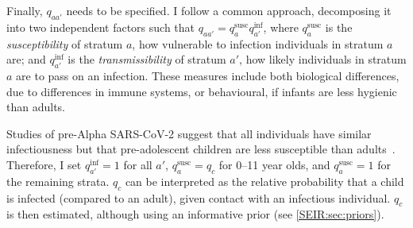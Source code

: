 \documentclass[thesis.tex]{subfiles}
\begin{document}

Finally, $q_{aa'}$ needs to be specified.
I follow a common approach, decomposing it into two independent factors such that $q_{aa'} = q^\text{susc}_{a} q^\text{inf}_{a'}$, where $q^\text{susc}_a$ is the \emph{susceptibility} of stratum $a$, \ie how vulnerable to infection individuals in stratum $a$ are; and $q^\text{inf}_{a'}$ is the \emph{transmissibility} of stratum $a'$, \ie how likely individuals in stratum $a$ are to pass on an infection.
These measures include both biological differences, \eg due to differences in immune systems, or behavioural, \eg if infants are less hygienic than adults.


Studies of pre-Alpha SARS-CoV-2 suggest that all individuals have similar infectiousness but that pre-adolescent children are less susceptible than adults~\autocites{chenRole}{vinerTransmission}.
Therefore, I set $q^\text{inf}_{a'} = 1$ for all $a'$, $q^\text{susc}_{a} = q_c$ for 0--11 year olds, and $q^\text{susc}_{a} = 1$ for the remaining strata.
$q_c$ can be interpreted as the relative probability that a child is infected (compared to an adult), given contact with an infectious individual.
$q_c$ is then estimated, although using an informative prior (see \cref{SEIR:sec:priors}).
\end{document}
